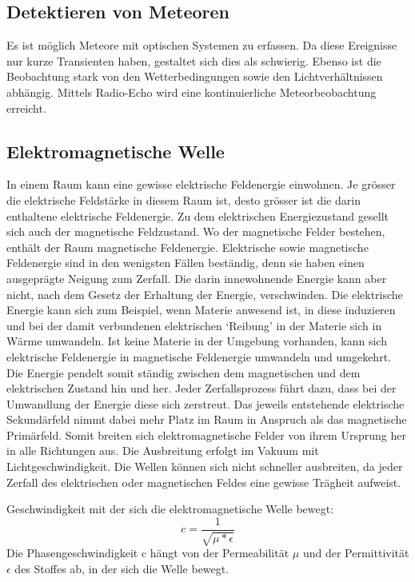 \begin{refsection}
\section{Detektieren von Meteoren}

Es ist möglich Meteore mit optischen Systemen zu erfassen. 
Da diese Ereignisse nur kurze Transienten haben, gestaltet sich dies als schwierig.
Ebenso ist die Beobachtung stark von den Wetterbedingungen sowie den Lichtverhältnissen abhängig.
Mittels Radio-Echo wird eine kontinuierliche Meteorbeobachtung erreicht. 

\subsection{Elektromagnetische Welle}
In einem Raum kann eine gewisse elektrische Feldenergie einwohnen.
Je grösser die elektrische Feldstärke in diesem Raum ist, desto grösser ist die darin enthaltene elektrische Feldenergie.
Zu dem elektrischen Energiezustand gesellt sich auch der magnetische Feldzustand.
Wo der magnetische Felder bestehen, enthält der Raum magnetische Feldenergie.
Elektrische sowie magnetische Feldenergie sind in den wenigsten Fällen beständig, denn sie haben einen ausgeprägte Neigung zum Zerfall.
Die darin innewohnende Energie kann aber nicht, nach dem Gesetz der Erhaltung der Energie, verschwinden.
Die elektrische Energie kann sich zum Beispiel, wenn Materie anwesend ist, in diese induzieren und bei der damit verbundenen elektrischen `Reibung' in der Materie sich in Wärme umwandeln.
Ist keine Materie in der Umgebung vorhanden, kann sich elektrische Feldenergie in magnetische Feldenergie umwandeln und umgekehrt. 
Die Energie pendelt somit ständig zwischen dem magnetischen und dem elektrischen Zustand hin und her.
Jeder Zerfallsprozess führt dazu, dass bei der Umwandlung der Energie diese sich zerstreut.
Das jeweils entstehende elektrische Sekundärfeld nimmt dabei mehr Platz im Raum in Anspruch als das magnetische Primärfeld.
Somit breiten sich elektromagnetische Felder von ihrem Ursprung her in alle Richtungen aus.
Die Ausbreitung erfolgt im Vakuum mit Lichtgeschwindigkeit.
Die Wellen können sich nicht schneller ausbreiten, da jeder Zerfall des elektrischen oder magnetischen Feldes eine gewisse Trägheit aufweist.\cite{buch:meinke}

Geschwindigkeit mit der sich die elektromagnetische Welle bewegt:
\[
c
=
\frac{1}{\sqrt{\mu*\epsilon}}
\]
Die Phasengeschwindigkeit c hängt von der Permeabilität $\mu$ und der Permittivität $\epsilon$ des Stoffes ab, in der sich die Welle bewegt.


\end{refsection}
